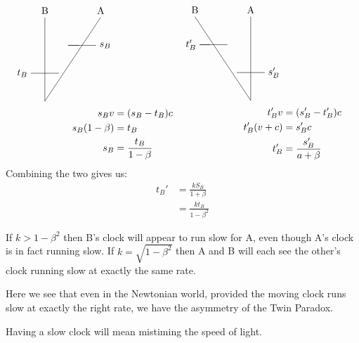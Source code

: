 \documentclass{report}
\begin{document}
\begin{equation*}
  \begin{aligned}[c]
    \begin{tikzpicture}
      \coordinate (A) at (0,0);
      \draw (A) -- +(0, 3) node[pos=1,above] {B};
      \draw (A) -- (2, 3) node[pos=0.666] (sa) {} node[pos=1,above] {A};
      \draw (-0.5, 1) node[left] {$t_B$} -- (0.5, 1);
      \draw (sa) -- +(-0.5, 0) -- +(0.5, 0) node[right] {$s_B$};
    \end{tikzpicture}\\
    s_Bv &=(s_B - t_B)c \\
s_B (1 - \beta) &=t_B \\
s_B & = \frac{t_B}{1 - \beta} 
  \end{aligned}
  \begin{aligned}[c]
    \begin{tikzpicture}
      \coordinate (RO) at (8,0);
      \draw (RO) -- +(0, 3) node[pos=1,above] {A};
      \draw (RO) -- +(-2, 3) node[pos=0.666] (tb) {} node[pos=1,above] {B};
      \draw (7.5, 1)  -- (8.5, 1) node[pos=1, right] {$s_B'$};
      \draw (tb) -- +(-0.5, 0) -- +(0.5, 0) node[pos=0, left] {$t_B'$};
    \end{tikzpicture} \\
    t_B' v&= (s_B'-t_B')c \\
    t_B'(v + c) &= s_B'c \\
t_B'&=\frac{s_B'}{a+\beta} 
  \end{aligned}
\end{equation*}
Combining the two gives us:
\begin{align*}
  t_B'&=\frac{kS_B}{1 + \beta} \\
&=\frac{kt_B}{1-\beta^2}
\end{align*}

If $k > 1 - \beta^2$ then B's clock will appear to run slow for A, even though A's clock is in fact running slow. If $k = \sqrt{1 - \beta^2}$ then A and B will each see the other's clock running slow at exactly the same rate.

Here we see that even in the Newtonian world, provided the moving clock runs slow at exactly the right rate, we have the asymmetry of the Twin Paradox.

Having a slow clock will mean mistiming the speed of light.

\end{document}

